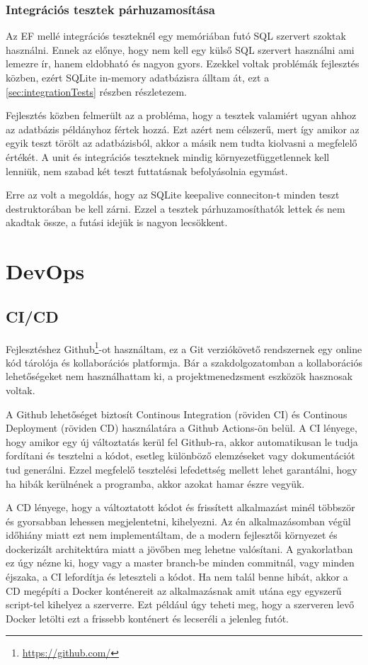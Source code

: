\subsubsection{Integrációs tesztek párhuzamosítása}

Az EF mellé integrációs teszteknél egy memóriában futó SQL szervert szoktak használni. Ennek az előnye, hogy nem kell egy külső SQL szervert használni ami lemezre ír, hanem eldobható és nagyon gyors. Ezekkel voltak problémák fejlesztés közben, ezért SQLite in-memory adatbázisra álltam át, ezt a \ref{sec:integrationTests} részben részletezem.

Fejlesztés közben felmerült az a probléma, hogy a tesztek valamiért ugyan ahhoz az adatbázis példányhoz fértek hozzá. Ezt azért nem célszerű, mert így amikor az egyik teszt törölt az adatbázisból, akkor a másik nem tudta kiolvasni a megfelelő értékét. A unit és integrációs teszteknek mindig környezetfüggetlennek kell lenniük, nem szabad két teszt futtatásnak befolyásolnia egymást.

Erre az volt a megoldás, hogy az SQLite keepalive conneciton-t minden teszt destruktorában be kell zárni. Ezzel a tesztek párhuzamosíthatók lettek és nem akadtak össze, a futási idejük is nagyon lecsökkent.

\section{DevOps}
\subsection{CI/CD}
Fejlesztéshez Github\footnote{\url{https://github.com/}}-ot használtam, ez a Git verziókövető rendszernek egy online kód tárolója és kollaborációs platformja. Bár a szakdolgozatomban a kollaborációs lehetőségeket nem használhattam ki, a projektmenedzsment eszközök hasznosak voltak.

A Github lehetőséget biztosít Continous Integration (röviden CI) és Continous Deployment (röviden CD) használatára a Github Actions-ön belül. A CI lényege, hogy amikor egy új változtatás kerül fel Github-ra, akkor automatikusan le tudja fordítani és tesztelni a kódot, esetleg különböző elemzéseket vagy dokumentációt tud generálni. Ezzel megfelelő tesztelési lefedettség mellett lehet garantálni, hogy ha hibák kerülnének a programba, akkor azokat hamar észre vegyük.

A CD lényege, hogy a változtatott kódot és frissített alkalmazást minél többször és gyorsabban lehessen megjelentetni, kihelyezni. Az én alkalmazásomban végül időhiány miatt ezt nem implementáltam, de a modern fejlesztői környezet és dockerizált architektúra miatt a jövőben meg lehetne valósítani. A gyakorlatban ez úgy nézne ki, hogy vagy a master branch-be minden commitnál, vagy minden éjszaka, a CI lefordítja és leteszteli a kódot. Ha nem talál benne hibát, akkor a CD megépíti a Docker konténereit az alkalmazásnak amit utána egy egyszerű script-tel kihelyez a szerverre. Ezt például úgy teheti meg, hogy a szerveren levő Docker letölti ezt a frissebb konténert és lecseréli a jelenleg futót.


